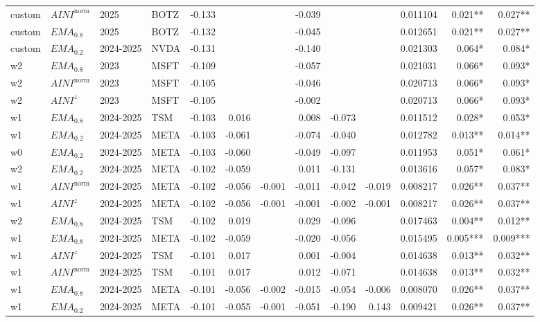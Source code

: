 \begin{longtable}{@{}llllrrrrrrrrr@{}}
custom & $AINI^{\mathrm{norm}}$ & 2025 & BOTZ & -0.133 &  &  & -0.039 &  &  & 0.011104 & 0.021** & 0.027** \\
custom & $EMA_{0.8}$ & 2025 & BOTZ & -0.132 &  &  & -0.045 &  &  & 0.012651 & 0.021** & 0.027** \\
custom & $EMA_{0.2}$ & 2024-2025 & NVDA & -0.131 &  &  & -0.140 &  &  & 0.021303 & 0.064* & 0.084* \\
w2 & $EMA_{0.8}$ & 2023 & MSFT & -0.109 &  &  & -0.057 &  &  & 0.021031 & 0.066* & 0.093* \\
w2 & $AINI^{\mathrm{norm}}$ & 2023 & MSFT & -0.105 &  &  & -0.046 &  &  & 0.020713 & 0.066* & 0.093* \\
w2 & $AINI^{z}$ & 2023 & MSFT & -0.105 &  &  & -0.002 &  &  & 0.020713 & 0.066* & 0.093* \\
w1 & $EMA_{0.8}$ & 2024-2025 & TSM & -0.103 & 0.016 &  & 0.008 & -0.073 &  & 0.011512 & 0.028* & 0.053* \\
w1 & $EMA_{0.2}$ & 2024-2025 & META & -0.103 & -0.061 &  & -0.074 & -0.040 &  & 0.012782 & 0.013** & 0.014** \\
w0 & $EMA_{0.2}$ & 2024-2025 & META & -0.103 & -0.060 &  & -0.049 & -0.097 &  & 0.011953 & 0.051* & 0.061* \\
w2 & $EMA_{0.2}$ & 2024-2025 & META & -0.102 & -0.059 &  & 0.011 & -0.131 &  & 0.013616 & 0.057* & 0.083* \\
w1 & $AINI^{\mathrm{norm}}$ & 2024-2025 & META & -0.102 & -0.056 & -0.001 & -0.011 & -0.042 & -0.019 & 0.008217 & 0.026** & 0.037** \\
w1 & $AINI^{z}$ & 2024-2025 & META & -0.102 & -0.056 & -0.001 & -0.001 & -0.002 & -0.001 & 0.008217 & 0.026** & 0.037** \\
w2 & $EMA_{0.8}$ & 2024-2025 & TSM & -0.102 & 0.019 &  & 0.029 & -0.096 &  & 0.017463 & 0.004** & 0.012** \\
w1 & $EMA_{0.8}$ & 2024-2025 & META & -0.102 & -0.059 &  & -0.020 & -0.056 &  & 0.015495 & 0.005*** & 0.009*** \\
w1 & $AINI^{z}$ & 2024-2025 & TSM & -0.101 & 0.017 &  & 0.001 & -0.004 &  & 0.014638 & 0.013** & 0.032** \\
w1 & $AINI^{\mathrm{norm}}$ & 2024-2025 & TSM & -0.101 & 0.017 &  & 0.012 & -0.071 &  & 0.014638 & 0.013** & 0.032** \\
w1 & $EMA_{0.8}$ & 2024-2025 & META & -0.101 & -0.056 & -0.002 & -0.015 & -0.054 & -0.006 & 0.008070 & 0.026** & 0.037** \\
w1 & $EMA_{0.2}$ & 2024-2025 & META & -0.101 & -0.055 & -0.001 & -0.051 & -0.190 & 0.143 & 0.009421 & 0.026** & 0.037** \\

\end{longtable}
